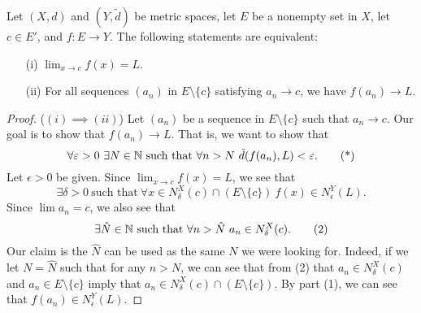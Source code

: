 \documentclass[a4paper]{article}
\begin{document}
\begin{theorem}
    Let \( (X,d)  \) and \( (Y, \tilde{d}) \) be metric spaces, let \( E  \) be a nonempty set in \( X  \), let \( c \in E' \), and \( f: E \to Y \). The following statements are equivalent:
    \begin{enumerate}
        \item[(i)] \( \lim_{ x \to c } f(x)= L  \).
        \item[(ii)] For all sequences \( ({a}_{n}) \) in \( E \setminus  \{ c  \}  \) satisfying \( {a}_{n} \to c  \), we have \( f({a}_{n}) \to L  \).
    \end{enumerate}
\end{theorem}
\begin{proof}
    (\( (i) \implies (ii) \)) Let \( ({a}_{n}) \) be a sequence in \( E \setminus  \{ c  \}  \) such that \( {a}_{n} \to c  \). Our goal is to show that \( f({a}_{n}) \to L  \). That is, we want to show that 
    \[  \forall \varepsilon > 0 \ \exists N \in \mathbb{N} \ \text{such that} \ \forall n > N \ \tilde{d}(f({a}_{n}), L) < \varepsilon. \tag{*} \]
    Let \( \epsilon > 0  \) be given. Since \( \lim_{ x \to c }  f(x) = L  \), we see that 
    \[  \exists \delta > 0 \ \text{such that} \ \forall x \in {N}_{\delta}^{X}(c) \cap (E \setminus  \{ c \} ) \ f(x) \in {N}_{\epsilon}^{Y}(L). \tag{1} \]
    Since \( \lim {a}_{n} = c \), we also see that
    \[  \exists \hat{N} \in \N \ \text{such that} \ \forall n > \hat{N} \ {a}_{n} \in {N}_{\delta}^{X}(c). \tag{2} \]
    Our claim is the \( \hat{N} \) can be used as the same \( N  \) we were looking for. Indeed, if we let \( N = \hat{N} \) such that for any \( n > N  \), we can see that from (2) that \( {a}_{n} \in {N}_{\delta}^{X}(c) \) and \( {a}_{n} \in E \setminus \{ c  \}  \) imply that \( {a}_{n} \in {N}_{\delta}^{X}(c) \cap (E \setminus  \{ c  \} ) \). By part (1), we can see that \( f({a}_{n}) \in {N}_{\epsilon}^{Y}(L) \).


\end{proof}
\end{document}
